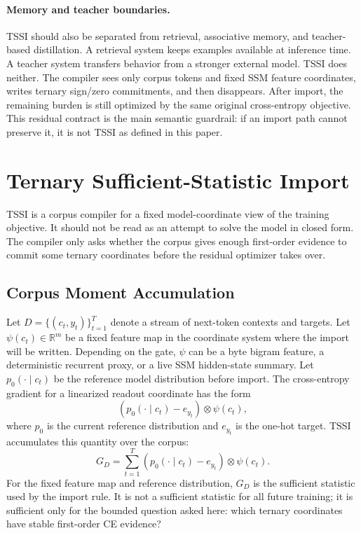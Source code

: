 \documentclass{article}
\begin{document}
\paragraph{Memory and teacher boundaries.}
TSSI should also be separated from retrieval, associative memory, and
teacher-based distillation. A retrieval system keeps examples available at
inference time. A teacher system transfers behavior from a stronger external
model. TSSI does neither. The compiler sees only corpus tokens and fixed SSM
feature coordinates, writes ternary sign/zero commitments, and then disappears.
After import, the remaining burden is still optimized by the same original
cross-entropy objective. This residual contract is the main semantic guardrail:
if an import path cannot preserve it, it is not TSSI as defined in this paper.

\section{Ternary Sufficient-Statistic Import}

TSSI is a corpus compiler for a fixed model-coordinate view of the training
objective. It should not be read as an attempt to solve the model in closed
form. The compiler only asks whether the corpus gives enough first-order
evidence to commit some ternary coordinates before the residual optimizer takes
over.

\subsection{Corpus Moment Accumulation}

Let $D = \{(c_t, y_t)\}_{t=1}^T$ denote a stream of next-token contexts and
targets. Let $\psi(c_t) \in \mathbb{R}^m$ be a fixed feature map in the
coordinate system where the import will be written. Depending on the gate,
$\psi$ can be a byte bigram feature, a deterministic recurrent proxy, or a live
SSM hidden-state summary. Let $p_0(\cdot \mid c_t)$ be the reference model
distribution before import. The cross-entropy gradient for a linearized readout
coordinate has the form
\begin{equation}
  \left(p_0(\cdot \mid c_t) - e_{y_t}\right) \otimes \psi(c_t),
\end{equation}
where $p_0$ is the current reference distribution and $e_{y_t}$ is the one-hot
target. TSSI accumulates this quantity over the corpus:
\begin{equation}
  G_D = \sum_{t=1}^T
  \left(p_0(\cdot \mid c_t) - e_{y_t}\right) \otimes \psi(c_t).
\end{equation}
For the fixed feature map and reference distribution, $G_D$ is the sufficient
statistic used by the import rule. It is not a sufficient statistic for all
future training; it is sufficient only for the bounded question asked here:
which ternary coordinates have stable first-order CE evidence?
\end{document}
